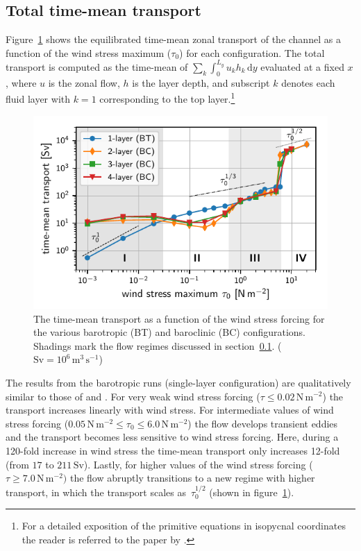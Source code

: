 \documentclass{agujournal2019}
\newcommand{\Pa}		{\mathrm{N}\,\mathrm{m}^{-2}}
\begin{document}
\subsection{Total time-mean transport}\label{sec:transport}

Figure~\ref{fig:transport} shows the equilibrated time-mean zonal transport of the channel as a function of the wind stress maximum ($\tau_0$) for each configuration. The total transport is computed as the time-mean of $\sum_k\int_0^{L_y} u_k h_k\,\mathrm{d}y$ evaluated at a fixed $x$, where $u$ is the zonal flow, $h$ is the layer depth, and subscript $k$ denotes each fluid layer with $k=1$ corresponding to the top layer.\footnote{For a detailed exposition of the primitive equations in isopycnal coordinates the reader is referred to the paper by .}

\begin{figure}
\centering
\noindent\includegraphics{transport}
\vspace*{-1em}\caption{The time-mean transport as a function of the wind stress forcing for the various barotropic (BT) and baroclinic (BC) configurations. Shadings mark the flow regimes discussed in section~\ref{sec:transport}.  ($\text{Sv} = 10^6\,\text{m}^3\,\text{s}^{-1}$)}\label{fig:transport}\vspace*{-3em}
\end{figure}




The results from the barotropic runs (single-layer configuration) are qualitatively similar to those of  and . For very weak wind stress forcing ($\tau\le0.02\,\Pa$) the transport increases linearly with wind stress. For intermediate values of wind stress forcing ($0.05\,\Pa\le\tau_0\le 6.0\,\Pa$) the flow develops transient eddies and the transport becomes less sensitive to wind stress forcing. Here, during a 120-fold increase in wind stress the time-mean transport only increases 12-fold (from $17$ to $211\,\mathrm{Sv}$). Lastly, for higher values of the wind stress forcing ($\tau\ge 7.0\,\Pa)$ the flow abruptly transitions to a new regime with higher transport, in which the transport scales as~$\tau_0^{1/2}$ (shown in figure~\ref{fig:transport}).
\end{document}
